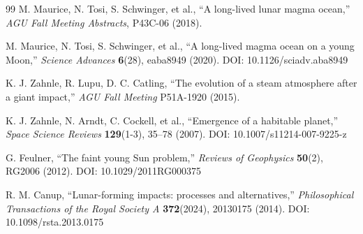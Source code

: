 \documentclass[11pt,a4paper]{article}
\begin{document}
\begin{thebibliography}{99}
		M. Maurice, N. Tosi, S. Schwinger, et al., ``A long-lived lunar magma ocean,''
		\emph{AGU Fall Meeting Abstracts}, P43C-06 (2018).
		
		M. Maurice, N. Tosi, S. Schwinger, et al., ``A long-lived magma ocean on a young Moon,''
		\emph{Science Advances} \textbf{6}(28), eaba8949 (2020).
		DOI: 10.1126/sciadv.aba8949
		
		K. J. Zahnle, R. Lupu, D. C. Catling, ``The evolution of a steam atmosphere after a giant impact,''
		\emph{AGU Fall Meeting} P51A-1920 (2015).
		
		K. J. Zahnle, N. Arndt, C. Cockell, et al., ``Emergence of a habitable planet,''
		\emph{Space Science Reviews} \textbf{129}(1-3), 35–78 (2007).
		DOI: 10.1007/s11214-007-9225-z
		
		G. Feulner, ``The faint young Sun problem,''
		\emph{Reviews of Geophysics} \textbf{50}(2), RG2006 (2012).
		DOI: 10.1029/2011RG000375
		
		R. M. Canup, ``Lunar-forming impacts: processes and alternatives,''
		\emph{Philosophical Transactions of the Royal Society A} \textbf{372}(2024), 20130175 (2014).
		DOI: 10.1098/rsta.2013.0175
		
	\end{thebibliography}
	
\end{document}
